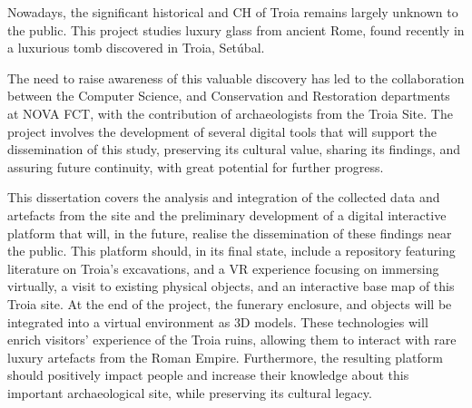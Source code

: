 
Nowadays, the significant historical and \gls{CH} of Troia remains largely unknown to the public. This project studies luxury glass from ancient Rome, found recently in a luxurious tomb discovered in Troia, Setúbal.  

The need to raise awareness of this valuable discovery has led to the collaboration between the Computer Science, and Conservation and Restoration departments at NOVA FCT, with the contribution of archaeologists from the Troia Site. The project involves the development of several digital tools that will support the dissemination of this study, preserving its cultural value, sharing its findings, and assuring future continuity, with great potential for further progress.  

This dissertation covers the analysis and integration of the collected data and artefacts from the site and the preliminary development of a digital interactive platform that will, in the future, realise the dissemination of these findings near the public. This platform should, in its final state, include a repository featuring literature on Troia’s excavations, and a \gls{VR} experience focusing on immersing virtually, a visit to existing physical objects, and an interactive base map of this Troia site. At the end of the project, the funerary enclosure, and objects will be integrated into a virtual environment as \gls{3D} models. These technologies will enrich visitors' experience of the Troia ruins, allowing them to interact with rare luxury artefacts from the Roman Empire. Furthermore, the resulting platform should positively impact people and increase their knowledge about this important archaeological site, while preserving its cultural legacy. 



